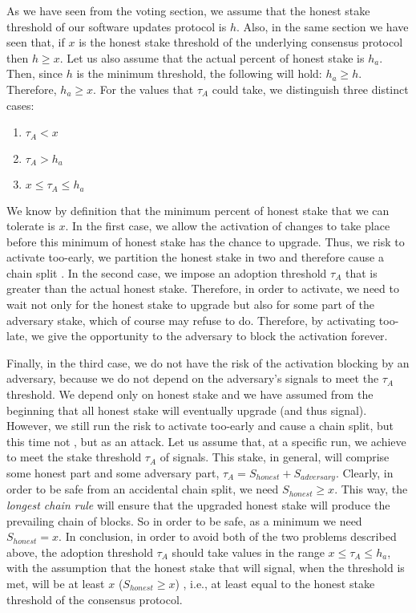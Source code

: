 As we have seen from the voting section, we assume that the honest stake threshold of our software updates protocol is $h$. Also, in the same section we have seen that, if $x$ is the honest stake threshold of the underlying consensus protocol then $h \geq x$. Let us also assume that the actual percent of honest stake is $h_a$. Then, since $h$ is the minimum threshold, the following will hold: $ h_a \geq h$. Therefore, $h_a \geq x$. For the values that $\tau_A$ could take, we distinguish three distinct cases:
\begin{enumerate}
\item $\tau_A < x$
\item $\tau_A > h_a$
\item $ x \leq \tau_A \leq h_a$
\end{enumerate}
We know by definition that the minimum percent of honest stake that we can tolerate is $x$. In the first case, we allow the activation of changes to take place before this minimum of honest stake has the chance to upgrade. Thus, we risk to activate too-early, we partition the honest stake in two and therefore cause a chain split . In the second case, we impose an adoption threshold $\tau_A$ that is greater than the actual honest stake. Therefore, in order to activate, we need to wait not only for the honest stake to upgrade but also for some part of the adversary stake, which of course may refuse to do. Therefore, by activating too-late, we give the opportunity to the adversary to block the activation forever.

Finally, in the third case, we do not have the risk of the activation blocking by an adversary, because we do not depend on the adversary's signals to meet the $\tau_A$ threshold. We depend only on honest stake and we have assumed from the beginning that all honest stake will eventually upgrade (and thus signal). However, we still run the risk to activate too-early and cause a chain split, but this time not , but as an attack. Let us assume that, at a specific run, we achieve to meet the stake threshold $\tau_A$ of signals. This stake, in general, will comprise some honest part and some adversary part, $\tau_A = S_{honest} + S_{adversary}$. Clearly, in order to be safe from an accidental chain split, we need $S_{honest} \geq x$. This way, the \emph{longest chain rule} will ensure that the upgraded honest stake will produce the prevailing chain of blocks. So in order to be safe, as a minimum we need $S_{honest} = x$. In conclusion, in order to avoid both of the two problems described above, the adoption threshold $\tau_A$ should take values in the range $x \leq \tau_A \leq h_a$, with the assumption that the honest stake that will signal, when the threshold is met, will be at least $x$ ($S_{honest} \geq x$) , i.e., at least equal to the honest stake threshold of the consensus protocol. 

